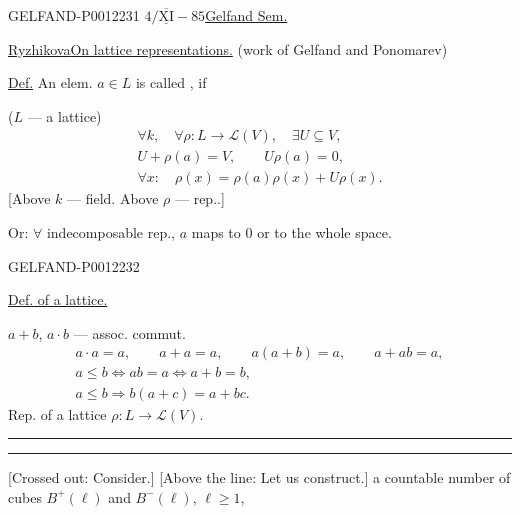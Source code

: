 


\begin{GelfandAdjacentEvidence}{GELFAND-P001223}{1}
\(4/\overline{\underline{\mathrm{XI}}}-85\)\quad\underline{Gelfand Sem.}

\underline{\underline{Ryzhikova}}\quad\underline{On lattice representations.}
(work of Gelfand and Ponomarev)

\underline{Def.} An elem. \(a\in L\) is called , if

(\(L\) --- a lattice)
\begin{equation*}
\begin{gathered}
\forall k,\quad\forall\rho:L\longrightarrow\mathcal L(V),\quad\exists U\subseteq V,\\
U+\rho(a)=V,\qquad U\rho(a)=0,\\
\forall x:\quad\rho(x)=\rho(a)\rho(x)+U\rho(x).
\end{gathered}
\end{equation*}
[Above \(k\) --- field. Above \(\rho\) --- rep..]

Or: \(\forall\) indecomposable rep., \(a\) maps to \(0\) or to the whole space.
\end{GelfandAdjacentEvidence}
\begin{GelfandAdjacentEvidence}{GELFAND-P001223}{2}


\underline{Def. of a lattice.}

\(a+b\), \(a\cdot b\) --- assoc. commut.
\begin{equation*}
\begin{gathered}
a\cdot a=a,\qquad a+a=a,\qquad a(a+b)=a,\qquad a+ab=a,\\
a\leq b\Longleftrightarrow ab=a\Longleftrightarrow a+b=b,\\
a\leq b\Longrightarrow b(a+c)=a+bc.
\end{gathered}
\end{equation*}
Rep. of a lattice \(\rho:L\longrightarrow\mathcal L(V)\).

\begin{center}\rule{.9em}{.35pt}\quad\rule{.9em}{.35pt}\end{center}

[Crossed out: Consider.] [Above the line: Let us construct.] a countable number of cubes \(B^+(\ell)\) and \(B^-(\ell)\),
\(\ell\geq1\),
\end{GelfandAdjacentEvidence}


